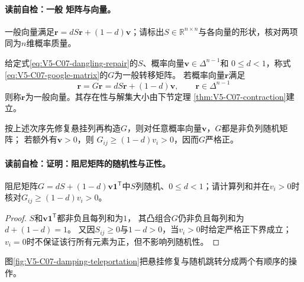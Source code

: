 \paragraph{读前自检：一般 矩阵与向量。}一般\PageRank{}向量满足$\boldsymbol r=dS\boldsymbol r+(1-d)\boldsymbol v$；请标出$S\in\mathbb R^{n\times n}$与各向量的形状，核对两项同为$n$维概率质量。\par

\begin{definition}\label{def:V5-C07-google}
给定式\eqref{eq:V5-C07-dangling-repair}的$S$、概率向量$\boldsymbol v\in\Delta^{n-1}$和
$0\le d<1$，称式\eqref{eq:V5-C07-google-matrix}的$G$为一般\PageRank{}转移矩阵。
若概率向量$\boldsymbol r$满足
\begin{equation}
\boldsymbol r=G\boldsymbol r
=dS\boldsymbol r+(1-d)\boldsymbol v,\qquad
\boldsymbol r\in\Delta^{n-1}
\label{eq:V5-C07-general-fixed}
\end{equation}
则称$\boldsymbol r$为一般\PageRank{}向量。其存在性与解集大小由下节定理
\ref{thm:V5-C07-contraction}建立。
\end{definition}

\begin{proposition}[阻尼矩阵的随机性与正性]\label{prop:V5-C07-google-positive}
按上述次序先修复悬挂列再构造$G$，则对任意概率向量$\boldsymbol v$，$G$都是非负列随机矩阵；
若额外有$\boldsymbol v>0$，则
$G_{ij}\ge(1-d)v_i>0$，因而$G$严格正。
\end{proposition}
\paragraph{读前自检：证明：阻尼矩阵的随机性与正性。}阻尼矩阵$G=dS+(1-d)\boldsymbol v\boldsymbol1^{\mathsf T}$中$S$列随机、$0\le d<1$；请计算列和并在$v_i>0$时核对$G_{ij}\ge(1-d)v_i>0$。\par

\begin{proof}
$S$和$\boldsymbol v\boldsymbol1^{\mathsf T}$都非负且每列和为$1$，
其凸组合$G$仍非负且每列和为$d+(1-d)=1$。
又因$S_{ij}\ge0$与$1-d>0$，当$v_i>0$时给定严格正下界成立；
$v_i=0$时不保证该行所有元素为正，但不影响列随机性。
\end{proof}
图\ref{fig:V5-C07-damping-teleportation}把悬挂修复与随机跳转分成两个有顺序的操作。




